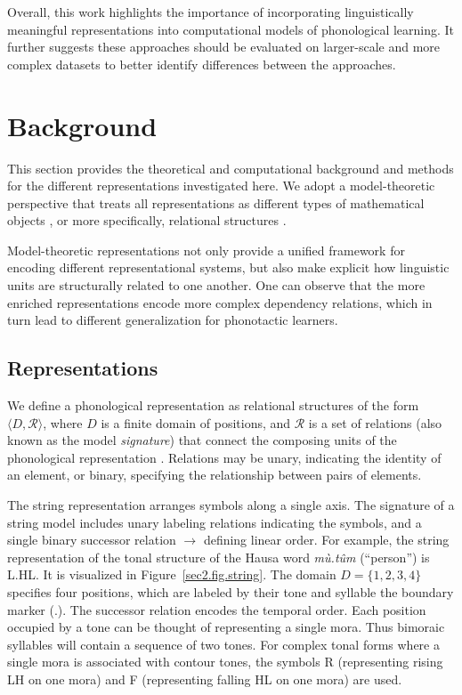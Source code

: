 \documentclass[11pt]{article}
\begin{document}
Overall, this work highlights the importance of incorporating
linguistically meaningful representations into computational models of
phonological learning. It further suggests these approaches should be
evaluated on larger-scale and more complex datasets to better identify
differences between the approaches.

\section{Background}
\label{sec:background}

This section provides the theoretical and computational background and
methods for the different representations investigated here.
We adopt a model-theoretic perspective that treats all representations as
different types of mathematical objects \citep{enderton2001mathematical}, or
more specifically, relational structures
\citep{rogers2013,chandleeBufia2019,rogers.lambert2019mol}.


Model-theoretic representations not only provide a unified framework 
for encoding different representational systems, but also make explicit 
how linguistic units are structurally related to one another. 
One can observe that the more enriched representations 
encode more complex dependency relations, which in turn lead to 
different generalization for phonotactic learners.


\subsection{Representations}

We define a phonological representation as relational structures of the
form $\langle D, \mathcal{R} \rangle$, where $D$ is a finite domain of
positions, and $\mathcal{R}$ is a set of relations (also known as the
model \textit{signature}) that connect the composing units of the
phonological representation \citep{strother2017using, jardine2016locality}.
Relations may be unary, indicating the identity of an element, or binary,
specifying the relationship between pairs of elements.

The string representation arranges symbols along a single axis.
The signature of a string model includes unary labeling relations indicating
the symbols, and a single binary successor relation $\rightarrow$ defining linear
order.
For example, the string representation of the tonal structure of the Hausa word
\textit{mù.tûm} (``person'') is L.HL.
It is visualized in Figure~\ref{sec2.fig.string}.
The domain  $D=\{1,2,3,4\}$ specifies four positions,
which are labeled by their tone and syllable the boundary marker (.).
The successor relation encodes the temporal order.
Each position occupied by a tone can be thought of representing a single mora.
Thus bimoraic syllables will contain a sequence of two tones.
For complex tonal forms where a single mora is associated with contour tones,
the symbols R (representing rising LH on one mora)
and F (representing falling HL on one mora) are used.
\end{document}
